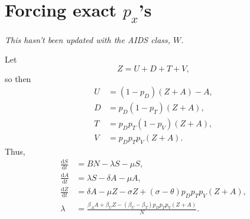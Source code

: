 \documentclass{article}
\newcommand{\md}{\mathrm{d}}
\begin{document}
\section{Forcing exact $p_x$'s}

\textit{This hasn't been updated with the AIDS class, $W$.}

Let
\begin{equation}
  Z =  U + D + T + V,
\end{equation}
so then
\begin{equation}
  \begin{split}
    U &= (1 - p_D) (Z + A) - A,
    \\
    D &= p_D (1 - p_T) (Z + A),
    \\
    T &= p_D p_T (1 - p_V) (Z + A),
    \\
    V &= p_D p_T p_V (Z + A).
  \end{split}
\end{equation}
Thus,
\begin{equation}
  \begin{split}
    \frac{\md S}{\md t} &= B N - \lambda S - \mu S,
    \\
    \frac{\md A}{\md t} &= \lambda S - \delta A - \mu A,
    \\
    \frac{\md Z}{\md t} &= \delta A - \mu Z - \sigma Z
    + (\sigma - \theta) p_D p_T p_V (Z + A),
    \\
    \lambda &= \frac{\beta_A A + \beta_U Z
      - (\beta_U - \beta_T) p_D p_T p_V (Z + A)}{N}.
  \end{split}
\end{equation}
\end{document}
